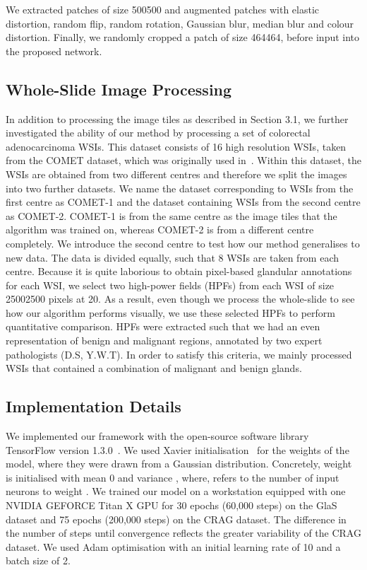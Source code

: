 \documentclass[3p]{elsarticle}
\begin{document}
We extracted patches of size 500500 and augmented patches with elastic distortion, random flip, random rotation, Gaussian blur, median blur and colour distortion. Finally, we randomly cropped a patch of size 464464, before input into the proposed network.

\subsection{Whole-Slide Image Processing}
In addition to processing the image tiles as described in Section 3.1, we further investigated the ability of our method by processing a set of colorectal adenocarcinoma WSIs. This dataset consists of 16 high resolution WSIs, taken from the COMET dataset, which was originally used in~\cite{sirinukunwattana2016locality}. Within this dataset, the WSIs are obtained from two different centres and therefore we split the images into two further datasets. We name the dataset corresponding to WSIs from the first centre as COMET-1 and the dataset containing WSIs from the second centre as COMET-2. COMET-1 is from the same centre as the image tiles that the algorithm was trained on, whereas COMET-2 is from a different centre completely. We introduce the second centre to test how our method generalises to new data. The data is divided equally, such that 8 WSIs are taken from each centre. Because it is quite laborious to obtain pixel-based glandular annotations for each WSI, we select two high-power fields (HPFs) from each WSI of size 25002500 pixels at 20. As a result, even though we process the whole-slide to see how our algorithm performs visually, we use these selected HPFs to perform quantitative comparison. HPFs were extracted such that we had an even representation of benign and malignant regions, annotated by two expert pathologists (D.S, Y.W.T). In order to satisfy this criteria, we mainly processed WSIs that contained a combination of malignant and benign glands.

\subsection{Implementation Details}
We implemented our framework with the open-source software library TensorFlow version 1.3.0~\citep{abadi2016tensorflow}. We used Xavier initialisation~\citep{glorot2010understanding} for the weights of the model, where they were drawn from a Gaussian distribution. Concretely, weight  is initialised with mean 0 and variance , where,  refers to the number of input neurons to weight . We trained our model on a workstation equipped with one NVIDIA GEFORCE Titan X GPU for 30 epochs (60,000 steps) on the GlaS dataset and 75 epochs (200,000 steps) on the CRAG dataset. The difference in the number of steps until convergence reflects the greater variability of the CRAG dataset. We used Adam optimisation with an initial learning rate of 10 and a batch size of 2.
\end{document}
